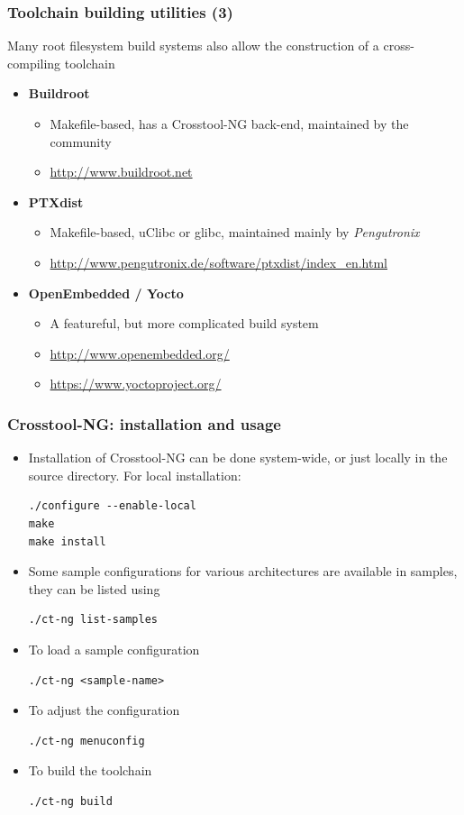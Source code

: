 \begin{frame}
\frametitle{Toolchain building utilities (3)}
Many root filesystem build systems also allow the construction of
a cross-compiling toolchain
\begin{itemize}
\item {\bf Buildroot}
  \begin{itemize}
  \item Makefile-based, has a Crosstool-NG back-end, maintained by the
    community
  \item \url{http://www.buildroot.net}
  \end{itemize}
\item {\bf PTXdist}
  \begin{itemize}
  \item Makefile-based, uClibc or glibc, maintained mainly by {\em Pengutronix}
  \item \url{http://www.pengutronix.de/software/ptxdist/index_en.html}
  \end{itemize}
\item {\bf OpenEmbedded / Yocto}
  \begin{itemize}
  \item A featureful, but more complicated build system
  \item \url{http://www.openembedded.org/}
  \item \url{https://www.yoctoproject.org/}
  \end{itemize}
\end{itemize}
\end{frame}

\begin{frame}[fragile]
  \frametitle{Crosstool-NG: installation and usage}
  \begin{itemize}
  \item Installation of Crosstool-NG can be done system-wide, or just locally in
    the source directory. For local installation:
\begin{verbatim}
./configure --enable-local
make
make install
\end{verbatim}
  \item Some sample configurations for various architectures are
    available in
    samples, they can be listed using
\begin{verbatim}
./ct-ng list-samples
\end{verbatim}
  \item To load a sample configuration
\begin{verbatim}
./ct-ng <sample-name>
\end{verbatim}
  \item To adjust the configuration
\begin{verbatim}
./ct-ng menuconfig
\end{verbatim}
  \item To build the toolchain
\begin{verbatim}
./ct-ng build
\end{verbatim}
  \end{itemize}
\end{frame}

